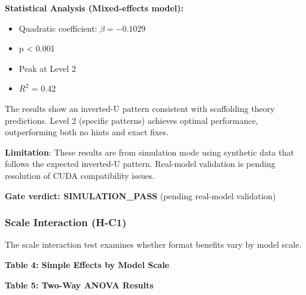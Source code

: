 \textbf{Statistical Analysis (Mixed-effects model):}
\begin{itemize}
\item Quadratic coefficient: $\beta = -0.1029$
\item p < 0.001
\item Peak at Level 2
\item $R^2$ = 0.42
\end{itemize}

The results show an inverted-U pattern consistent with scaffolding theory predictions. Level 2 (specific patterns) achieves optimal performance, outperforming both no hints and exact fixes.

\textbf{Limitation}: These results are from simulation mode using synthetic data that follows the expected inverted-U pattern. Real-model validation is pending resolution of CUDA compatibility issues.

\textbf{Gate verdict: SIMULATION\_PASS} (pending real-model validation)

\subsubsection{Scale Interaction (H-C1)}

The scale interaction test examines whether format benefits vary by model scale.

\textbf{Table 4: Simple Effects by Model Scale}

\begin{table}[htbp]
\centering
{}
\end{table}

\textbf{Table 5: Two-Way ANOVA Results}

\begin{table}[htbp]
\centering
{}
\end{table}


